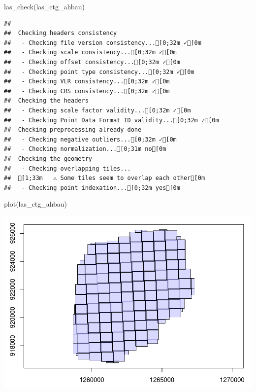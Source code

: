 \documentclass[
]{article}
\newenvironment{Shaded}{\begin{snugshade}}{\end{snugshade}}
\newcommand{\FunctionTok}[1]{\textcolor[rgb]{0.00,0.00,0.00}{#1}}
\newcommand{\NormalTok}[1]{#1}
\begin{document}
\begin{Shaded}
\begin{Highlighting}[]
\FunctionTok{las\_check}\NormalTok{(las\_ctg\_ahbau)}
\end{Highlighting}
\end{Shaded}

\begin{verbatim}
## 
##  Checking headers consistency
##   - Checking file version consistency...[0;32m ✓[0m
##   - Checking scale consistency...[0;32m ✓[0m
##   - Checking offset consistency...[0;32m ✓[0m
##   - Checking point type consistency...[0;32m ✓[0m
##   - Checking VLR consistency...[0;32m ✓[0m
##   - Checking CRS consistency...[0;32m ✓[0m
##  Checking the headers
##   - Checking scale factor validity...[0;32m ✓[0m
##   - Checking Point Data Format ID validity...[0;32m ✓[0m
##  Checking preprocessing already done 
##   - Checking negative outliers...[0;32m ✓[0m
##   - Checking normalization...[0;31m no[0m
##  Checking the geometry
##   - Checking overlapping tiles...
##  [1;33m   ⚠ Some tiles seem to overlap each other[0m
##   - Checking point indexation...[0;32m yes[0m
\end{verbatim}

\begin{Shaded}
\begin{Highlighting}[]
\FunctionTok{plot}\NormalTok{(las\_ctg\_ahbau)}
\end{Highlighting}
\end{Shaded}

\includegraphics{13_lidR_PointCloud_Processing_files/figure-latex/unnamed-chunk-2-1.pdf}
\end{document}
